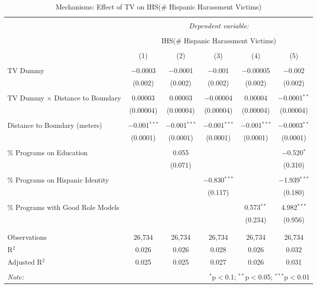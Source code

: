 
\begin{table}[!htbp] \centering 
  \caption{Mechanisms: Effect of TV on IHS(\# Hispanic Harassment Victims)} 
  \label{} 
\begin{tabular}{@{\extracolsep{-2pt}}lccccc} 
\\[-1.8ex]\hline 
\hline \\[-1.8ex] 
 & \multicolumn{5}{c}{\textit{Dependent variable:}} \\ 
\cline{2-6} 
\\[-1.8ex] & \multicolumn{5}{c}{IHS(\# Hispanic Harassment Victims)} \\ 
\\[-1.8ex] & (1) & (2) & (3) & (4) & (5)\\ 
\hline \\[-1.8ex] 
 TV Dummy & $-$0.0003 & $-$0.0001 & $-$0.001 & $-$0.00005 & $-$0.002 \\ 
  & (0.002) & (0.002) & (0.002) & (0.002) & (0.002) \\ 
  & & & & & \\ 
 TV Dummy $\times$ Distance to Boundary & 0.00003 & 0.00003 & $-$0.00004 & 0.00004 & $-$0.0001$^{**}$ \\ 
  & (0.00004) & (0.00004) & (0.00004) & (0.00004) & (0.00004) \\ 
  & & & & & \\ 
 Distance to Boundary (meters) & $-$0.001$^{***}$ & $-$0.001$^{***}$ & $-$0.001$^{***}$ & $-$0.001$^{***}$ & $-$0.0003$^{**}$ \\ 
  & (0.0001) & (0.0001) & (0.0001) & (0.0001) & (0.0001) \\ 
  & & & & & \\ 
 \% Programs on Education &  & 0.055 &  &  & $-$0.520$^{*}$ \\ 
  &  & (0.071) &  &  & (0.310) \\ 
  & & & & & \\ 
 \% Programs on Hispanic Identity &  &  & $-$0.830$^{***}$ &  & $-$1.939$^{***}$ \\ 
  &  &  & (0.117) &  & (0.180) \\ 
  & & & & & \\ 
 \% Programs with Good Role Models &  &  &  & 0.573$^{**}$ & 4.982$^{***}$ \\ 
  &  &  &  & (0.234) & (0.956) \\ 
  & & & & & \\ 
\hline \\[-1.8ex] 
Observations & 26,734 & 26,734 & 26,734 & 26,734 & 26,734 \\ 
R$^{2}$ & 0.026 & 0.026 & 0.028 & 0.026 & 0.032 \\ 
Adjusted R$^{2}$ & 0.025 & 0.025 & 0.027 & 0.026 & 0.031 \\ 
\hline 
\hline \\[-1.8ex] 
\textit{Note:}  & \multicolumn{5}{r}{$^{*}$p$<$0.1; $^{**}$p$<$0.05; $^{***}$p$<$0.01} \\ 
\end{tabular} 
\end{table} 
